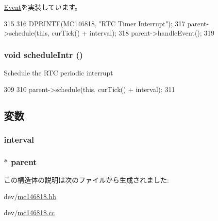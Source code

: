 \hyperlink{classEvent_a142b75b68a6291400e20fb0dd905b1c8}{Event}を実装しています。


\begin{DoxyCode}
315 {
316     DPRINTF(MC146818, "RTC Timer Interrupt\n");
317     parent->schedule(this, curTick() + interval);
318     parent->handleEvent();
319 }
\end{DoxyCode}
\hypertarget{structMC146818_1_1RTCEvent_a5300e17e5d721149683cb2bac69c7571}{
\subsubsection[{scheduleIntr}]{\setlength{\rightskip}{0pt plus 5cm}void scheduleIntr ()}}
\label{structMC146818_1_1RTCEvent_a5300e17e5d721149683cb2bac69c7571}
Schedule the RTC periodic interrupt 


\begin{DoxyCode}
309 {
310     parent->schedule(this, curTick() + interval);
311 }
\end{DoxyCode}


\subsection{変数}
\hypertarget{structMC146818_1_1RTCEvent_a75c022086cc1012d51fcf693b9539b8f}{
\subsubsection[{interval}]{ {\bf interval}}}
\label{structMC146818_1_1RTCEvent_a75c022086cc1012d51fcf693b9539b8f}
\hypertarget{structMC146818_1_1RTCEvent_a2013f7dfc8d6920600d61ad1f696a537}{
\subsubsection[{parent}]{$\ast$ {\bf parent}}}
\label{structMC146818_1_1RTCEvent_a2013f7dfc8d6920600d61ad1f696a537}


この構造体の説明は次のファイルから生成されました:\begin{DoxyCompactItemize}
\item 
dev/\hyperlink{mc146818_8hh}{mc146818.hh}\item 
dev/\hyperlink{mc146818_8cc}{mc146818.cc}\end{DoxyCompactItemize}
